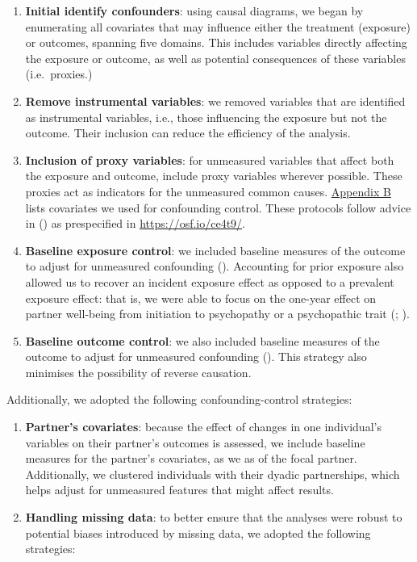 \documentclass[
  singlecolumn]{article}
\begin{document}
\begin{enumerate}
\def\labelenumi{\arabic{enumi}.}
\item
  \textbf{Initial identify confounders}: using causal diagrams, we began
  by enumerating all covariates that may influence either the treatment
  (exposure) or outcomes, spanning five domains. This includes variables
  directly affecting the exposure or outcome, as well as potential
  consequences of these variables (i.e.~proxies.)
\item
  \textbf{Remove instrumental variables}: we removed variables that are
  identified as instrumental variables, i.e., those influencing the
  exposure but not the outcome. Their inclusion can reduce the
  efficiency of the analysis.
\item
  \textbf{Inclusion of proxy variables}: for unmeasured variables that
  affect both the exposure and outcome, include proxy variables wherever
  possible. These proxies act as indicators for the unmeasured common
  causes. \hyperref[appendix-demographics]{Appendix B} lists covariates
  we used for confounding control. These protocols follow advice in
  () as prespecified
  in \url{https://osf.io/ce4t9/}.
\item
  \textbf{Baseline exposure control}: we included baseline measures of
  the outcome to adjust for unmeasured confounding
  ().
  Accounting for prior exposure also allowed us to recover an incident
  exposure effect as opposed to a prevalent exposure effect: that is, we
  were able to focus on the one-year effect on partner well-being from
  initiation to psychopathy or a psychopathic trait
  (;
  ).
\item
  \textbf{Baseline outcome control}: we also included baseline measures
  of the outcome to adjust for unmeasured confounding
  (). This
  strategy also minimises the possibility of reverse causation.
\end{enumerate}

Additionally, we adopted the following confounding-control strategies:

\begin{enumerate}
\def\labelenumi{\arabic{enumi}.}
\setcounter{enumi}{5}
\item
  \textbf{Partner's covariates}: because the effect of changes in one
  individual's variables on their partner's outcomes is assessed, we
  include baseline measures for the partner's covariates, as we as of
  the focal partner. Additionally, we clustered individuals with their
  dyadic partnerships, which helps adjust for unmeasured features that
  might affect results.
\item
  \textbf{Handling missing data}: to better ensure that the analyses
  were robust to potential biases introduced by missing data, we adopted
  the following strategies:
\end{enumerate}
\end{document}
